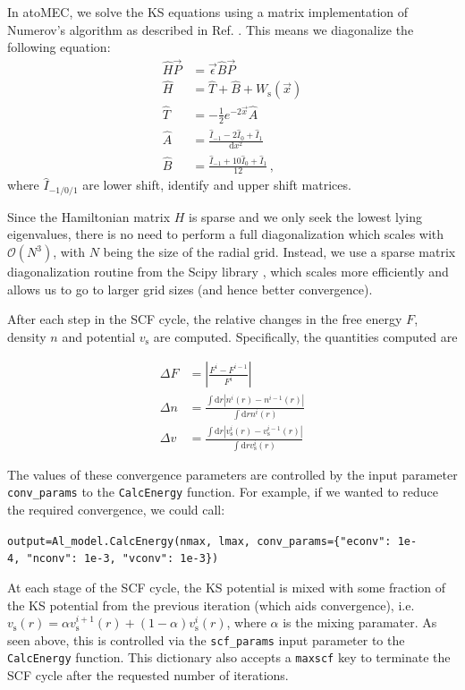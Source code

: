 \documentclass[9pt]{article}
\newcommand{\onlinecite}[1]{\hspace{-1 ex} \nocite{#1}\citenum{#1}}
\begin{document}
In atoMEC, we solve the KS equations using a matrix implementation of
Numerov's algorithm as described in Ref. \onlinecite{matrixnumerov}.
This means we diagonalize the following equation: \begin{align}
\hat{H}\vec{P} &= \vec{\epsilon} \hat{B} \vec{P} \\
\hat{H} &= \hat{T} + \hat{B} + W_\textrm{s}(\vec{x}) \\
\hat{T} &= -\frac{1}{2} e^{-2\vec{x}} \hat{A} \\
\hat{A} &= \frac{\hat{I}_{-1} -2\hat{I}_0 + \hat{I}_1}{\textrm{d}x^2} \\
\hat{B} &= \frac{\hat{I}_{-1} +10\hat{I}_0 + \hat{I}_1}{12}\,,
\end{align} where \(\hat{I}_{-1/0/1}\) are lower shift, identify and
upper shift matrices.

Since the Hamiltonian matrix \(H\) is sparse and we only seek the lowest
lying eigenvalues, there is no need to perform a full diagonalization
which scales with \(\mathcal{O}(N^3)\), with \(N\) being the size of the
radial grid. Instead, we use a sparse matrix diagonalization routine
from the Scipy library \cite{scipy}, which scales more efficiently and
allows us to go to larger grid sizes (and hence better convergence).

After each step in the SCF cycle, the relative changes in the free
energy \(F\), density \(n\) and potential \(v_\textrm{s}\) are computed.
Specifically, the quantities computed are

\begin{align}
    \Delta F &= \left|\frac{F^{i}-F^{i-1}}{F^{i}}\right| \\
    \Delta n &= \frac{\int \mathrm{d}r|n^i(r)-n^{i-1}(r)|}{\int \mathrm{d}r n^i(r)}\\
    \Delta v &= \frac{\int \mathrm{d}r|v^i_\textrm{s}(r)-v_\textrm{s}^{i-1}(r)|}{\int \mathrm{d}r v_\textrm{s}^i(r)}
\end{align}

The values of these convergence parameters are controlled by the input
parameter \texttt{conv\_params} to the \texttt{CalcEnergy} function. For
example, if we wanted to reduce the required convergence, we could call:

\texttt{output=Al\_model.CalcEnergy(nmax,\ lmax,\ conv\_params=\{"econv":\ 1e-4,\ "nconv":\ 1e-3,\ "vconv":\ 1e-3\})}

At each stage of the SCF cycle, the KS potential is mixed with some
fraction of the KS potential from the previous iteration (which aids
convergence),
i.e.~\(v_\textrm{s}(r) = \alpha v^{i+1}_\textrm{s}(r) + (1-\alpha) v^i_\textrm{s}(r)\),
where \(\alpha\) is the mixing paramater. As seen above, this is
controlled via the \texttt{scf\_params} input parameter to the
\texttt{CalcEnergy} function. This dictionary also accepts a
\texttt{maxscf} key to terminate the SCF cycle after the requested
number of iterations.
\end{document}
